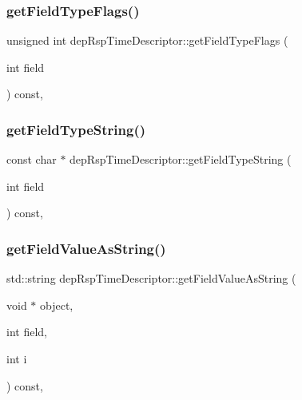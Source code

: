 \subsubsection{\texorpdfstring{get\+Field\+Type\+Flags()}{getFieldTypeFlags()}}
{\footnotesize\ttfamily unsigned int dep\+Rsp\+Time\+Descriptor\+::get\+Field\+Type\+Flags (\begin{DoxyParamCaption}\item[{int}]{field }\end{DoxyParamCaption}) const\hspace{0.3cm}{\ttfamily [override]}, {\ttfamily [virtual]}}

\mbox{\label{classdep_rsp_time_descriptor_a230884891fa25dd60490fbf1b72dd5ab}} 
\subsubsection{\texorpdfstring{get\+Field\+Type\+String()}{getFieldTypeString()}}
{\footnotesize\ttfamily const char $\ast$ dep\+Rsp\+Time\+Descriptor\+::get\+Field\+Type\+String (\begin{DoxyParamCaption}\item[{int}]{field }\end{DoxyParamCaption}) const\hspace{0.3cm}{\ttfamily [override]}, {\ttfamily [virtual]}}

\mbox{\label{classdep_rsp_time_descriptor_acdc1e2c5d57b9ade8cdd45472ca82719}} 
\subsubsection{\texorpdfstring{get\+Field\+Value\+As\+String()}{getFieldValueAsString()}}
{\footnotesize\ttfamily std\+::string dep\+Rsp\+Time\+Descriptor\+::get\+Field\+Value\+As\+String (\begin{DoxyParamCaption}\item[{void $\ast$}]{object,  }\item[{int}]{field,  }\item[{int}]{i }\end{DoxyParamCaption}) const\hspace{0.3cm}{\ttfamily [override]}, {\ttfamily [virtual]}}

